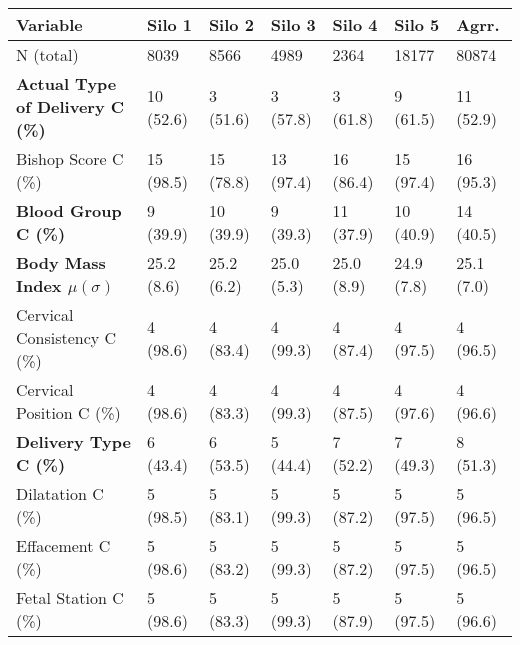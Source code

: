 
\begin{tabular}{LLLLLLL}
   \toprule
      Variable &               Silo 1 &               Silo 2 &               Silo 3 &               Silo 4 &               Silo 5 &                Agrr. \\
   \midrule
   \hspace*{2mm} N (total) &              8039 &                 8566 &                 4989 &                 2364 &                18177 &                80874 \\
   
   \textbf{Actual Type of Delivery C (\%)}& 10 (52.6) & 3 (51.6) & 3 (57.8) & 3 (61.8) & 9 (61.5) & 11 (52.9) \\
   
   Bishop Score C (\%)&  15 (98.5) & 15 (78.8) & 13 (97.4) & 16 (86.4) & 15 (97.4) & 16 (95.3) \\
   
   \textbf{Blood Group C (\%)}& 9 (39.9) & 10 (39.9) & 9 (39.3) & 11 (37.9) & 10 (40.9) & 14 (40.5) \\
   
   \textbf{Body Mass Index $\mu (\sigma)$ } & 25.2 (8.6) & 25.2 (6.2) & 25.0 (5.3) & 25.0 (8.9) & 24.9 (7.8) & 25.1 (7.0) \\
   
   Cervical Consistency C (\%) & 4 (98.6) & 4 (83.4) & 4 (99.3) & 4 (87.4) & 4 (97.5) & 4 (96.5) \\
   
   Cervical Position C (\%)&  4 (98.6) & 4 (83.3) & 4 (99.3) & 4 (87.5) & 4 (97.6) & 4 (96.6) \\
   
   \textbf{Delivery Type C (\%)}& 6 (43.4) & 6 (53.5) & 5 (44.4) & 7 (52.2) & 7 (49.3) & 8 (51.3) \\
   
   Dilatation C (\%)&5 (98.5) & 5 (83.1) & 5 (99.3) & 5 (87.2) & 5 (97.5) & 5 (96.5) \\
   
   Effacement C (\%)& 5 (98.6) & 5 (83.2) & 5 (99.3) & 5 (87.2) & 5 (97.5) & 5 (96.5) \\
   
   Fetal Station  C (\%)&  5 (98.6) & 5 (83.3) & 5 (99.3) & 5 (87.9) & 5 (97.5) & 5 (96.6) \\
   

\end{tabular}
